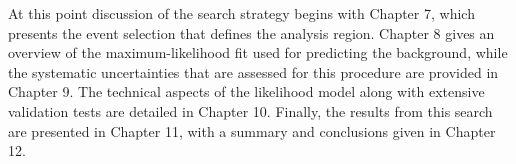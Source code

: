 At this point discussion of the search strategy begins with Chapter 7, which presents the event selection that defines the analysis region.
Chapter 8 gives an overview of the maximum-likelihood fit used for predicting the background, while the systematic uncertainties that are assessed for this procedure are provided in Chapter 9.
The technical aspects of the likelihood model along with extensive validation tests are detailed in Chapter 10.
Finally, the results from this search are presented in Chapter 11, with a summary and conclusions given in Chapter 12.

